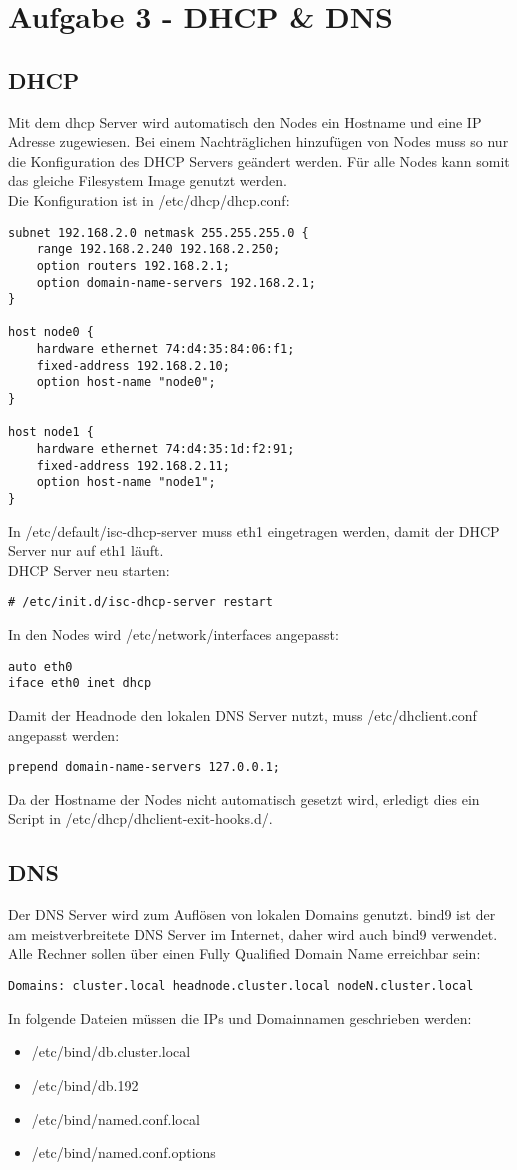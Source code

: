\chapter{Aufgabe 3 - DHCP \& DNS}
\section{DHCP}
Mit dem dhcp Server wird automatisch den Nodes ein Hostname und eine IP Adresse zugewiesen. Bei einem Nachträglichen hinzufügen von Nodes muss so nur
die Konfiguration des DHCP Servers geändert werden. Für alle Nodes kann somit das gleiche Filesystem Image genutzt werden.\\
Die Konfiguration ist in /etc/dhcp/dhcp.conf:
\begin{lstlisting}[style=Bash]
subnet 192.168.2.0 netmask 255.255.255.0 {
	range 192.168.2.240 192.168.2.250;
	option routers 192.168.2.1;
	option domain-name-servers 192.168.2.1;
}

host node0 {
	hardware ethernet 74:d4:35:84:06:f1;
	fixed-address 192.168.2.10;
	option host-name "node0";
}

host node1 {
	hardware ethernet 74:d4:35:1d:f2:91;
	fixed-address 192.168.2.11;
	option host-name "node1";
}
\end{lstlisting}
In /etc/default/isc-dhcp-server muss eth1 eingetragen werden, damit der DHCP Server nur auf eth1 läuft.\\
DHCP Server neu starten:
\begin{lstlisting}[style=Bash]
# /etc/init.d/isc-dhcp-server restart
\end{lstlisting}
In den Nodes wird /etc/network/interfaces angepasst:
\begin{lstlisting}[style=Bash]
auto eth0
iface eth0 inet dhcp
\end{lstlisting}
Damit der Headnode den lokalen DNS Server nutzt, muss /etc/dhclient.conf angepasst werden:
\begin{lstlisting}[style=Bash]
prepend domain-name-servers 127.0.0.1;
\end{lstlisting}
Da der Hostname der Nodes nicht automatisch gesetzt wird, erledigt dies ein Script in /etc/dhcp/dhclient-exit-hooks.d/.
\section{DNS}
Der DNS Server wird zum Auflösen von lokalen Domains genutzt. bind9 ist der am meistverbreitete DNS Server im Internet, daher wird auch bind9 verwendet.\\
Alle Rechner sollen über einen Fully Qualified Domain Name erreichbar sein:
\begin{lstlisting}[style=Bash]
Domains: cluster.local headnode.cluster.local nodeN.cluster.local
\end{lstlisting}
In folgende Dateien müssen die IPs und Domainnamen geschrieben werden:
\begin {itemize}
\item /etc/bind/db.cluster.local
\item /etc/bind/db.192
\item /etc/bind/named.conf.local
\item /etc/bind/named.conf.options
\end{itemize}
